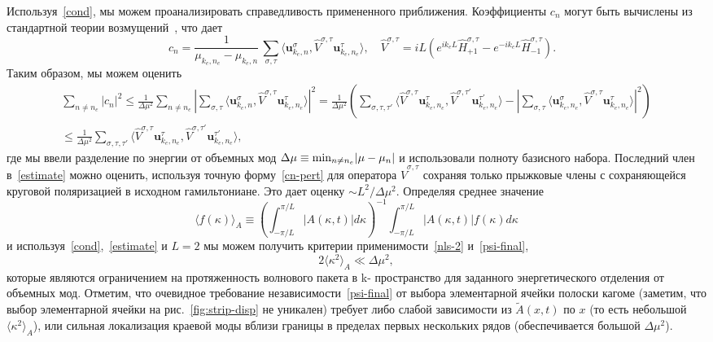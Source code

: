 \documentclass[
aps,
prl,
groupedaddress,
superscriptaddress,
floatfix,
notitlepage
]{revtex4-1}
\begin{document}
Используя~\eqref{cond}, мы можем проанализировать справедливость примененного приближения.
Коэффициенты $c_n$ могут быть вычислены из стандартной теории возмущений~\cite{LL-III}, что дает
\begin{equation}
\quad
c_n = \frac{1}{\mu_{k_e,n_e}-\mu_{k_e,n}}\,
\sum_{\sigma,\tau} \langle \pmb{u}^{\sigma}_{k_e,n}, \hat{V}^{\sigma,\tau}
\pmb{u}^{\tau}_{k_e,n_e}
\rangle,
\quad
\hat{V}^{\sigma,\tau} = iL \left(e^{ik_eL} \hat H_{+1}^{\sigma,\tau} - e^{-ik_eL} \hat H_{-1}^{\sigma,\tau}\right).
\label{cn-pert}
\end{equation}
Таким образом, мы можем оценить
\begin{multline}
\sum_{n\neq n_e}|c_n|^2 \le \frac{1}{\Delta\mu^2} 
\sum_{n\neq n_e} 
\left|\sum_{\sigma,\tau} \langle \pmb{u}^{\sigma}_{k_e,n}, \hat{V}^{\sigma,\tau}\pmb{u}^{\tau}_{k_e,n_e} \rangle\right|^2
=
\frac{1}{\Delta\mu^2} \left(
\sum_{\sigma,\tau,\tau'} 
\langle \hat{V}^{\sigma,\tau}\pmb{u}^{\tau}_{k_e,n_e} , \hat{V}^{\sigma,\tau'}\pmb{u}^{\tau'}_{k_e,n_e}\rangle
- \left| \sum_{\sigma,\tau} \langle \pmb{u}^{\sigma}_{k_e,n_e}, \hat{V}^{\sigma,\tau}\pmb{u}^{\tau}_{k_e,n_e} \rangle \right|^2
\right) 
\\
\le \frac{1}{\Delta\mu^2}
\sum_{\sigma,\tau,\tau'} 
\langle \hat{V}^{\sigma,\tau}\pmb{u}^{\tau}_{k_e,n_e} , \hat{V}^{\sigma,\tau'}\pmb{u}^{\tau'}_{k_e,n_e}\rangle,
\label{estimate}
\end{multline}
где мы ввели разделение по энергии от объемных мод $\Delta\mu\equiv {\rm min}_{n\neq n_e} |\mu-\mu_n|$
и использовали полноту базисного набора.
Последний член в~\eqref{estimate} можно оценить, используя точную форму~\eqref{cn-pert} для оператора $\hat{V}^{\sigma,\tau}$ сохраняя только прыжковые члены с сохраняющейся круговой поляризацией в исходном гамильтониане.
Это дает оценку $\sim L^2/\Delta\mu^2$.
Определяя среднее значение
$$
\langle f(\kappa) \rangle_{A} \equiv \left( \int_{-\pi/L}^{\pi/L} |A(\kappa,t)| d\kappa\right)^{-1} \int_{-\pi/L}^{\pi/L} |A(\kappa,t)| f(\kappa) d\kappa
$$
и используя~\eqref{cond},~\eqref{estimate} и $L=2$ мы можем получить критерии применимости~\eqref{nls-2} и~\eqref{psi-final},
\begin{equation}
2\langle \kappa^2 \rangle_{A} \ll \Delta\mu^2,
\label{cond-final}
\end{equation}
которые являются ограничением на протяженность волнового пакета в k- пространство для заданного энергетического отделения от объемных мод.
Отметим, что очевидное требование независимости~\eqref{psi-final} от выбора элементарной ячейки полоски кагоме (заметим, что выбор элементарной ячейки на рис.~\ref{fig:strip-disp} не уникален) требует либо слабой зависимости из $\tilde{A}(x,t)$ по $x$ (то есть небольшой $\langle \kappa^2 \rangle_{A}$), или сильная локализация краевой моды
вблизи границы в пределах первых нескольких рядов (обеспечивается большой $\Delta\mu^2$).
\end{document}
